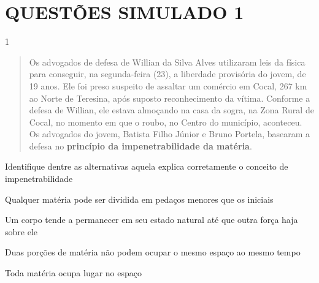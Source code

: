 \chapter{QUESTÕES SIMULADO 1}

\num{1}
  \begin{quote}
  Os advogados de defesa de Willian da Silva Alves utilizaram leis da
  física para conseguir, na segunda-feira
  (23), a
  liberdade provisória do jovem, de 19 anos. Ele foi
  preso suspeito
  de assaltar um
  comércio em Cocal,
  267 km ao Norte
  de Teresina,
  após suposto reconhecimento da vítima. Conforme a defesa de Willian,
  ele estava almoçando na casa da sogra, na Zona Rural de Cocal, no
  momento em que o roubo, no Centro do município, aconteceu. Os
  advogados do jovem, Batista Filho Júnior e Bruno Portela, basearam a
  defesa no \textbf{princípio da impenetrabilidade da matéria}.

\end{quote}

Identifique dentre as alternativas aquela explica corretamente o
conceito de impenetrabilidade

\begin{escolha}
\item
  Qualquer matéria pode ser dividida em pedaços menores que os iniciais
\item
  Um corpo tende a permanecer em seu estado natural até que outra força
  haja sobre ele
\item
  Duas porções de matéria não podem ocupar o mesmo espaço ao mesmo tempo
\item
  Toda matéria ocupa lugar no espaço
\end{escolha}


